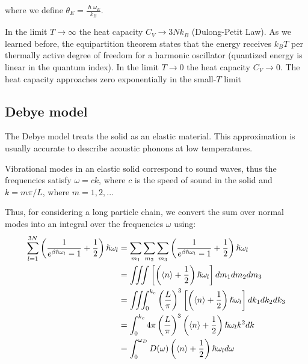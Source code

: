 \documentclass[book.tex]{subfiles}
\begin{document}
\noindent where we define $\theta_E = \frac{\hslash\omega_E}{k_B}$.

In the limit $T \rightarrow \infty$ the heat capacity $C_V \rightarrow 3Nk_B$ (Dulong-Petit Law). As we learned before, the equipartition theorem states that the energy receives $k_BT$ per thermally active degree of freedom for a harmonic oscillator (quantized energy is linear in the quantum index). In the limit $T \rightarrow 0$ the heat capacity $C_V \rightarrow 0$. The heat capacity approaches zero exponentially in the small-$T$ limit %


\subsection{Debye model}
The Debye model treats the solid as an elastic material. This approximation is usually accurate to describe acoustic phonons at low temperatures.

Vibrational modes in an elastic solid correspond to sound waves, thus the frequencies satisfy $\omega=ck$, where $c$ is the speed of sound in the solid and $k = m\pi/L$, where $m=1,2,...$

Thus, for considering a long particle chain, we convert the sum over normal modes into an integral over the frequencies $\omega$ using:
\begin{align}
\sum_{l=1}^{3N} \left( \frac{1}{e^{\beta\hslash\omega_l} - 1} + \frac{1}{2} \right)\hslash\omega_l &=\sum_{m_1}\sum_{m_2}\sum_{m_3} \left( \frac{1}{e^{\beta\hslash\omega_l} - 1} + \frac{1}{2} \right)\hslash\omega_l \notag\\
&= \iiint \left[\left( \langle n \rangle + \frac{1}{2} \right)\hslash\omega_l\right] dm_1dm_2dm_3 \notag\\
&=\iiint_0^{k_c} \left(\frac{L}{\pi}\right)^3 \left[\left( \langle n \rangle + \frac{1}{2} \right)\hslash\omega_l\right] dk_1dk_2dk_3 \notag\\
&= \int_0^{k_c} 4\pi\left(\frac{L}{\pi}\right)^3 \left( \langle n \rangle + \frac{1}{2} \right)\hslash\omega_l k^2 dk \notag\\
&= \int_0^{\omega_D}D(\omega) \left( \langle n \rangle + \frac{1}{2} \right) \hslash\omega_l d\omega\notag
\end{align}
\end{document}
